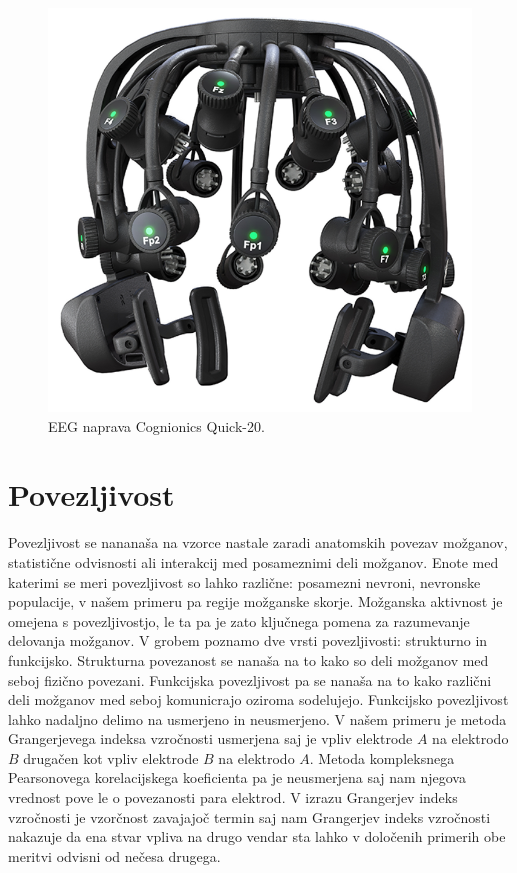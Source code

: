 \begin{figure}[h!]
    \begin{center}
    \includegraphics[width=0.5\linewidth]{slike/Cognionics Quick-20.png}
    \end{center}
    \caption{EEG naprava Cognionics Quick-20. \cite{DryEEGHeadset}}
    \end{figure}

\section{Povezljivost}
Povezljivost se nananaša na vzorce nastale zaradi anatomskih povezav možganov, statistične odvisnosti ali interakcij med posameznimi deli možganov.  Enote med katerimi se meri povezljivost so lahko različne: posamezni nevroni, nevronske populacije, v našem primeru pa regije možganske skorje. Možganska aktivnost je omejena s povezljivostjo, le ta pa je zato ključnega pomena za razumevanje delovanja možganov. V grobem poznamo dve vrsti povezljivosti: strukturno in funkcijsko. Strukturna povezanost se nanaša na to kako so deli možganov med seboj fizično povezani. Funkcijska povezljivost pa se nanaša na to kako različni deli možganov med seboj komunicrajo oziroma sodelujejo.\cite{spornsBrainConnectivity2007} Funkcijsko povezljivost lahko nadaljno delimo na usmerjeno in neusmerjeno. V našem primeru je metoda Grangerjevega indeksa vzročnosti usmerjena saj je vpliv elektrode $A$ na elektrodo $B$ drugačen kot vpliv elektrode $B$ na elektrodo $A$. Metoda kompleksnega Pearsonovega korelacijskega koeficienta pa je neusmerjena saj nam njegova vrednost pove le o povezanosti para elektrod.
V izrazu Grangerjev indeks vzročnosti je vzorčnost zavajajoč termin saj nam Grangerjev indeks vzročnosti nakazuje da ena stvar vpliva na drugo vendar sta lahko v določenih primerih obe meritvi odvisni od nečesa drugega. 
